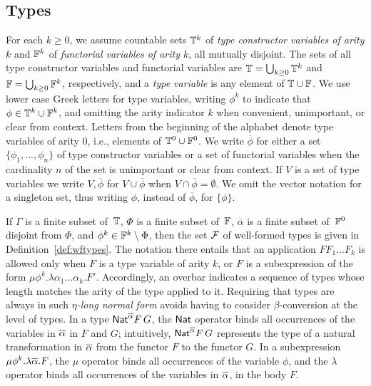\documentclass{lmcs}
\theoremstyle{plain}\newtheorem{satz}[thm]{Satz}
\begin{document}
{\subsection{Types}
For each $k \ge 0$, we assume countable sets $\mathbb{T}^k$ of \emph{type
  constructor variables of arity $k$} and $\mathbb{F}^k$ of
\emph{functorial variables of arity $k$}, all mutually disjoint.  The
sets of all type constructor variables and functorial variables are
$\mathbb{T} = \bigcup_{k \ge 0} \mathbb{T}^k$ and $\mathbb{F} = \bigcup_{k \ge 0}
\mathbb{F}^k$, respectively, and a \emph{type variable} is any element of
$\mathbb{T} \cup \mathbb{F}$.  We use lower case Greek letters for type
variables, writing $\phi^k$ to indicate that $\phi \in \mathbb{T}^k \cup
\mathbb{F}^k$, and omitting the arity indicator $k$ when convenient,
unimportant, or clear from context. Letters from the beginning of the
alphabet denote type variables of arity $0$, i.e., elements of
$\mathbb{T}^0 \cup \mathbb{F}^0$. We write $\overline{\phi}$ for either a set
$\{\phi_1,...,\phi_n\}$ of type constructor variables or a set of
functorial variables when the cardinality $n$ of the set is
unimportant or clear from context. If $V$ is a set of type variables
we write $V, \overline{\phi}$ for $V \cup \overline{\phi}$ when $V
\cap \overline{\phi} = \emptyset$.  We omit the vector notation for a
singleton set, thus writing $\phi$, instead of $\overline{\phi}$, for
$\{\phi\}$.

If $\Gamma$ is a finite subset of\, $\mathbb{T}$, $\Phi$ is a finite
subset of\, $\mathbb{F}$, $\overline{\alpha}$ is a finite subset of\,
$\mathbb{F}^0$ disjoint from $\Phi$, and $\phi^k \in \mathbb{F}^k \setminus
\Phi$, then the set $\mathcal{F}$ of well-formed types is given in
Definition~\ref{def:wftypes}. The notation there entails that an
application $F F_1...F_k$ is allowed only when $F$ is a type variable
of arity $k$, or $F$ is a subexpression of the form $\mu
\phi^{k}.\lambda \alpha_1...\alpha_k.F'$. Accordingly, an overbar
indicates a sequence of types whose length matches the arity of the
type applied to it.  Requiring that types are always in such
\emph{$\eta$-long normal form} avoids having to consider
$\beta$-conversion at the level of types. In a type
$\mathsf{Nat}^{\overline{\alpha}}F\,G$, the $\mathsf{Nat}$ operator binds all occurrences of
the variables in $\overline{\alpha}$ in $F$ and $G$; intuitively,
$\mathsf{Nat}^{\overline{\alpha}}F\,G$ represents the type of a natural
transformation in $\overline{\alpha}$ from the functor $F$ to the functor
$G$.  In a subexpression $\mu \phi^k.\lambda \overline{\alpha}.F$, the $\mu$
operator binds all occurrences of the variable $\phi$, and the
$\lambda$ operator binds all occurrences of the variables in
$\overline{\alpha}$, in the body $F$.

}
\end{document}
